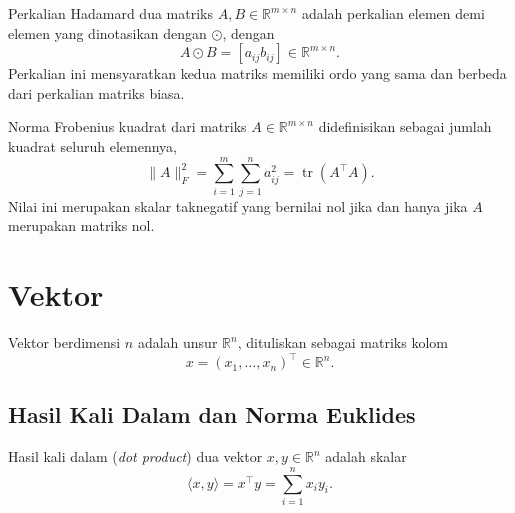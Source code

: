 \begin{definisi}
\label{def:hadamard}
Perkalian Hadamard dua matriks $A,B\in\mathbb{R}^{m\times n}$ adalah
perkalian elemen demi elemen yang dinotasikan dengan $\odot$, dengan
\begin{equation}
A\odot B=[a_{ij}b_{ij}]\in\mathbb{R}^{m\times n}.
\label{eq:hadamard}
\end{equation}
Perkalian ini mensyaratkan kedua matriks memiliki ordo yang sama dan
berbeda dari perkalian matriks biasa.
\end{definisi}

\begin{definisi}
\label{def:normafrobenius}
Norma Frobenius kuadrat dari matriks $A\in\mathbb{R}^{m\times n}$
didefinisikan sebagai jumlah kuadrat seluruh elemennya,
\begin{equation}
\lVert A\rVert_F^2
=\sum_{i=1}^{m}\sum_{j=1}^{n}a_{ij}^{2}
=\operatorname{tr}(A^\top A).
\label{eq:normafrobenius}
\end{equation}
Nilai ini merupakan skalar taknegatif yang bernilai nol jika dan hanya
jika $A$ merupakan matriks nol.
\end{definisi}


\section{Vektor}
\label{sec:vektor}

\begin{definisi}
\label{def:vektor}
Vektor berdimensi $n$ adalah unsur $\mathbb{R}^{n}$, dituliskan sebagai
matriks kolom
\begin{equation}
x=(x_1,\ldots,x_n)^\top\in\mathbb{R}^{n}.
\label{eq:vektor}
\end{equation}
\end{definisi}

\subsection{Hasil Kali Dalam dan Norma Euklides}
\label{subsec:hasilkalidalam}

\begin{definisi}
\label{def:hasilkalidalam}
Hasil kali dalam (\textit{dot product}) dua vektor
$x,y\in\mathbb{R}^{n}$ adalah skalar
\begin{equation}
\langle x,y\rangle
=x^\top y
=\sum_{i=1}^{n}x_i y_i.
\label{eq:hasilkalidalam}
\end{equation}
\end{definisi}

